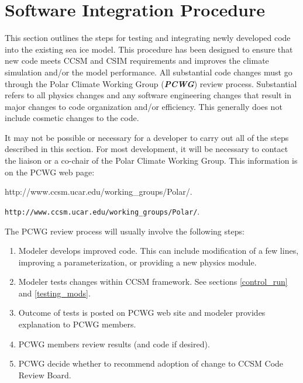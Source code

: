 
\section{Software Integration Procedure}

This section outlines the steps for testing and integrating newly developed
code into the existing sea ice model.  This procedure has been designed to
ensure that new code meets CCSM and CSIM requirements and improves the climate
simulation and/or the model performance.  All substantial code changes
must go through the Polar Climate Working Group ({\bf \textsl{PCWG}}) review process.
Substantial refers to all physics changes and any software engineering
changes that result in major changes to code organization and/or efficiency.
This generally does not include cosmetic changes to the code.

It may not be possible or necessary for a developer to carry out all of the steps
described in this section. For most development, it will be necessary to 
contact the liaison or a co-chair of the Polar Climate Working Group. This
information is on the PCWG web page: \\

\begin{htmlonly}
                      {http://www.ccsm.ucar.edu/working_groups/Polar/}. \\
\end{htmlonly}
\begin{latexonly}
  {\tt http://www.ccsm.ucar.edu/working\_groups/Polar/}. \\
\end{latexonly}

The PCWG review process will usually involve the following steps:

\begin{enumerate}
  \item Modeler develops improved code.  This can include modification
        of a few lines, improving a parameterization, or providing a
        new physics module.
  \item Modeler tests changes within CCSM framework.  See sections 
        \ref{control_run} and \ref{testing_mods}.
  \item Outcome of tests is posted on PCWG web site and modeler provides
        explanation to PCWG members.
  \item PCWG members review results (and code if desired).
  \item PCWG decide whether to recommend adoption of change to CCSM Code
        Review Board.
\end{enumerate}

